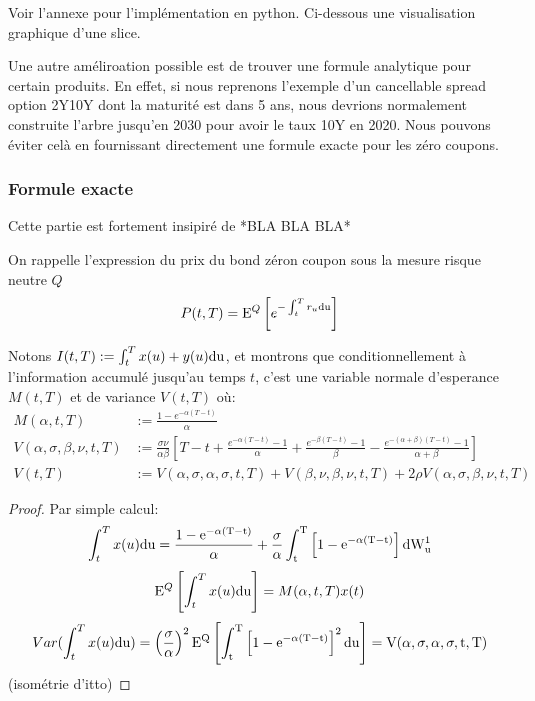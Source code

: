 

Voir l'annexe pour l'implémentation en python. Ci-dessous une visualisation graphique d'une slice.


Une autre améliroation possible est de trouver une formule analytique pour certain produits. En effet, si nous reprenons l'exemple d'un cancellable spread option 2Y10Y dont la maturité est dans 5 ans, nous devrions normalement construite l'arbre jusqu'en 2030 pour avoir le taux 10Y en 2020. Nous pouvons éviter celà en fournissant directement une formule exacte pour les zéro coupons.

\subsubsection{Formule exacte}
Cette partie est fortement insipiré de *BLA BLA BLA*

On rappelle l'expression du prix du bond zéron coupon sous la mesure risque neutre $Q$
$$P(t, T) = \mathrm{E}^Q \left[  e^{-\int_t^T r_u \rm{d}u} \right] $$

Notons $I(t, T) := \int_t^T x(u) + y(u) \rm{d}u$, et montrons que conditionnellement à l'information accumulé jusqu'au temps $t$, c'est une variable normale d'esperance $M(t, T)$ et de variance $V(t, T)$ où:
\begin{align}
  M(\alpha, t, T) &:= \frac{1 - e^{-\alpha (T-t) }}{\alpha} \\
  V(\alpha, \sigma, \beta, \nu, t, T) &:= \frac{\sigma \nu}{\alpha \beta} \left[ T - t + \frac{e^{-\alpha (T-t) } - 1}{\alpha} + \frac{e^{-\beta (T-t) } - 1}{\beta} - \frac{e^{-(\alpha + \beta) (T-t) } - 1}{\alpha + \beta} \right] \\
  V(t, T) &:= V(\alpha, \sigma, \alpha, \sigma, t, T)
            + V(\beta, \nu, \beta, \nu, t, T)
            + 2 \rho V(\alpha, \sigma, \beta, \nu, t, T)
\end{align}

\begin{proof}
  Par simple calcul:
  $$  \int_t^T x(u) \rm{d}u = \frac{1 - e^{-\alpha (T-t)}}{\alpha} + \frac{\sigma}{\alpha} \int_t^T \left[1 - e^{-\alpha (T-t)}\right] \rm{d} W^1_u$$
  $$  \mathrm{E}^Q \left[ \int_t^T x(u) \rm{d}u \right] = M(\alpha, t, T) x(t)$$
  $$ Var(\int_t^T x(u) \rm{d}u) =   \left(\frac{\sigma}{\alpha}\right)^2 \mathrm{E}^Q \left[  \int_t^T \left[1 - e^{-\alpha (T-t)}\right]^2 \rm{d}u  \right] = V(\alpha, \sigma, \alpha, \sigma, t, T)$$ (isométrie d'itto)
\end{proof}

